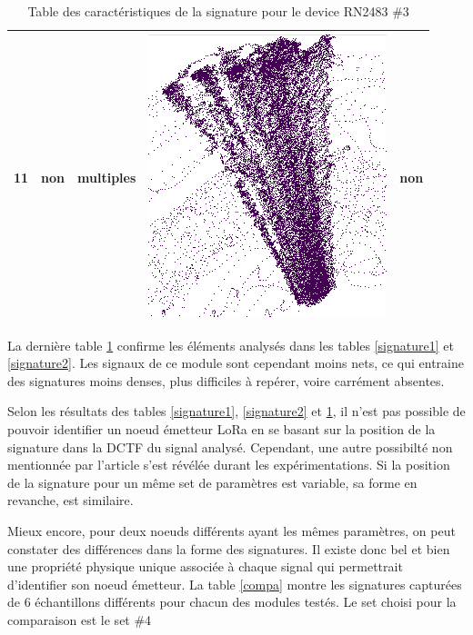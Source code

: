\begin{table}[h]
\begin{tabular}{|c|c|c|c|c|}
\hline
11 & non & multiples & \includegraphics[scale=0.2]{images/set33.png}  & non \\
\hline
\end{tabular}
\caption{Table des caractéristiques de la signature pour le device RN2483 \#3}
\label{signature3}
\end{table}

La dernière table \ref{signature3} confirme les éléments analysés dans les tables \ref{signature1} et \ref{signature2}. Les signaux de ce module sont cependant moins nets, ce qui entraine des signatures moins denses, plus difficiles à repérer, voire carrément absentes.

\vspace{0.1cm}

Selon les résultats des tables \ref{signature1}, \ref{signature2} et \ref{signature3}, il n'est pas possible de pouvoir identifier un noeud émetteur \ac{LoRa} en se basant sur la position de la signature dans la \ac{DCTF} du signal analysé. Cependant, une autre possibilté non mentionnée par l'article s'est révélée durant les expérimentations. Si la position de la signature pour un même set de paramètres est variable, sa forme en revanche, est similaire. 

Mieux encore, pour deux noeuds différents ayant les mêmes paramètres, on peut constater des différences dans la forme des signatures. Il existe donc bel et bien une propriété physique unique associée à chaque signal qui permettrait d'identifier son noeud émetteur. La table \ref{compa} montre les signatures capturées de 6 échantillons différents pour chacun des modules testés. Le set choisi pour la comparaison est le set \#4

